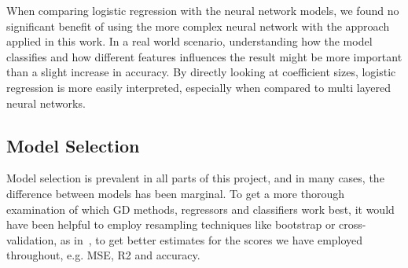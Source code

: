         When comparing logistic regression with the neural network models, we found no significant benefit of using the more complex neural network with the approach applied in this work. In a real world scenario, understanding how the model classifies and how different features influences the result might be more important than a slight increase in accuracy. By directly looking at coefficient sizes, logistic regression is more easily interpreted, especially when compared to multi layered neural networks.  
        
        
\subsection{Model Selection}
    Model selection is prevalent in all parts of this project, and in many cases, the difference between models has been marginal. To get a more thorough examination of which GD methods, regressors and classifiers work best, it would have been helpful to employ resampling techniques like bootstrap or cross-validation, as in~\citep{Project1}, to get better estimates for the scores we have employed throughout, e.g. MSE, R2 and accuracy.